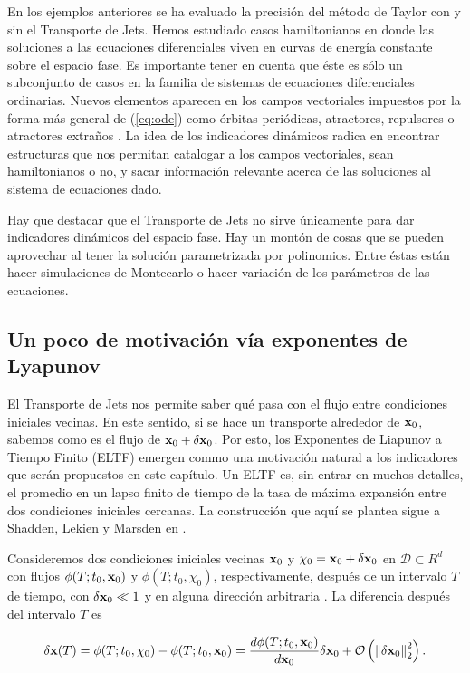 En los ejemplos anteriores se ha evaluado la precisión del método de Taylor con y sin el Transporte de Jets. Hemos estudiado casos hamiltonianos en donde las soluciones a las ecuaciones diferenciales viven en curvas de energía constante sobre el espacio fase. Es importante tener en cuenta que éste es sólo un subconjunto de casos en la familia de sistemas de ecuaciones diferenciales ordinarias. Nuevos elementos aparecen en los campos vectoriales impuestos por la forma más general de (\ref{eq:ode}) como órbitas periódicas, atractores, repulsores o atractores extraños \cite{Perez2015}. La idea de los indicadores dinámicos radica en encontrar estructuras que nos permitan catalogar a los campos vectoriales, sean hamiltonianos o no, y sacar información relevante acerca de las soluciones al sistema de ecuaciones dado. 

Hay que destacar que el Transporte de Jets no sirve únicamente para dar indicadores dinámicos del espacio fase. Hay un montón de cosas que se pueden aprovechar al tener la solución parametrizada por polinomios. Entre éstas están hacer simulaciones de Montecarlo o hacer variación de los parámetros de las ecuaciones.

\subsection{Un poco de motivación vía exponentes de Lyapunov}
\label{sec:FTLE}

El Transporte de Jets nos permite saber qué pasa con el flujo entre condiciones iniciales vecinas. En este sentido, si se hace un transporte alrededor de $\mathbf{x}_0$, sabemos como es el flujo de $\mathbf{x}_0 + \delta \mathbf{x}_0$. Por esto, los Exponentes de Liapunov a Tiempo Finito (ELTF) emergen commo una motivación natural a los indicadores que serán propuestos en este capítulo. Un ELTF es, sin entrar en muchos detalles, el promedio en un lapso finito de tiempo de la tasa de máxima expansión entre dos condiciones iniciales cercanas. La construcción que aquí se plantea sigue a Shadden, Lekien y Marsden en \cite{Shadden2005}.

Consideremos dos condiciones iniciales vecinas $\mathbf{x}_0$ y $\mathbf{\chi}_0 = \mathbf{x}_0 + \delta \mathbf{x}_0$ en $\mathcal{D} \subset R^d$ con flujos $\phi(T;t_0, \mathbf{x}_0)$ y $\phi(T;t_0, \chi_0)$, respectivamente, después de un intervalo $T$ de tiempo, con $\delta \mathbf{x}_0 \ll 1$ y en alguna dirección arbitraria . La diferencia después del intervalo $T$ es

\begin{equation}
 \delta \mathbf{x}(T) = \phi(T;t_0, \chi_0) - \phi(T;t_0, \mathbf{x}_0) = \frac{d \phi(T;t_0, \mathbf{x}_0)}{d\mathbf{x}_0} \delta \mathbf{x}_0 + \mathcal{O} \left( \left\lVert \delta \mathbf{x}_0\right\rVert_2^2 \right).
 \label{eq:perturbation}
\end{equation}

